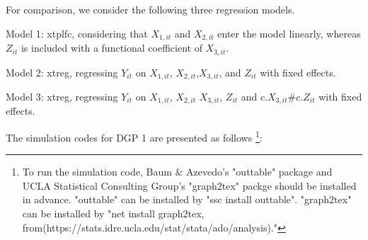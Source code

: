 
For comparison, we consider the following three regression models.

Model 1: xtplfc, considering that $X_{1,it}$ and $X_{2,it}$ enter the model linearly, whereas $Z_{it}$ is included with a functional coefficient of $X_{3,it}$.

Model 2: xtreg, regressing $Y_{it}$ on $X_{1,it}$, $X_{2,it}$,$X_{3,it}$, and $Z_{it}$ with fixed effects.

Model 3: xtreg, regressing $Y_{it}$ on $X_{1,it}$, $X_{2,it}$ $X_{3,it}$, $Z_{it}$ and $c.X_{3,it}\#c.Z_{it}$ with fixed effects.


The simulation codes for DGP 1 are presented as follows \footnote{To run the simulation code, Baum \& Azevedo's "outtable" package and UCLA Statistical Consulting Group's "graph2tex" packge should be installed in advance. "outtable" can be installed by "ssc install outtable". "graph2tex" can be installed by "net install graph2tex, from(https://stats.idre.ucla.edu/stat/stata/ado/analysis)."}:



